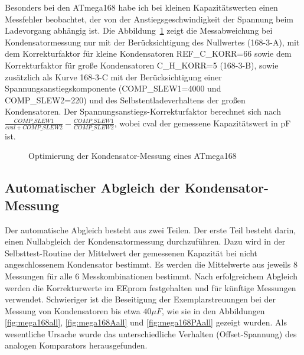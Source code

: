 Besonders bei den ATmega168 habe ich bei kleinen Kapazitätswerten einen Messfehler beobachtet, 
der von der Anstiegsgeschwindigkeit der Spannung beim Ladevorgang abhängig ist.
Die Abbildung~\ref{fig:mega168optcap} zeigt die Messabweichung bei Kondensatormessung nur mit der Berücksichtigung des
Nullwertes (168-3-A), mit dem Korrekturfaktor für kleine Kondensatoren REF\_C\_KORR=66 sowie dem Korrekturfaktor für große
Kondensatoren C\_H\_KORR=5 (168-3-B), sowie zusätzlich als Kurve 168-3-C  mit der Berücksichtigung einer Span\-nungs\-an\-stiegs\-kom\-po\-nen\-te 
(COMP\_SLEW1=4000 und COMP\_SLEW2=220) und des Selbst\-ent\-lade\-ver\-hal\-tens der großen Kon\-den\-sa\-toren.
Der Span\-nungs\-an\-stiegs-Kor\-rek\-tur\-faktor berechnet sich nach \(\frac{COMP\_SLEW1}{cval+COMP\_SLEW2} - \frac{COMP\_SLEW1}{COMP\_SLEW2}\),
wobei cval der gemessene Kapazitätswert in pF ist.

\begin{figure}[H]
\centering

\caption{Optimierung der Kondensator-Messung eines ATmega168}
\label{fig:mega168optcap}
\end{figure}

\subsection{Automatischer Abgleich der Kondensator-Messung}

Der automatische Abgleich besteht aus zwei Teilen. Der erste Teil besteht darin, einen Nullabgleich der Kondensatormessung durchzuführen.
Dazu wird in der Selbsttest-Routine der Mittelwert der gemessenen Kapazität bei nicht angeschlossenem Kondensator bestimmt.
Es werden die Mittelwerte aus jeweils 8 Messungen für alle 6 Messkombinationen bestimmt.
Nach erfolgreichem Abgleich werden die Korrekturwerte im EEprom festgehalten und für künftige Messungen verwendet.
Schwieriger ist die Beseitigung der Exemplarstreuungen bei der Messung von Kondensatoren bis etwa \(40 \mu F\), wie sie in den 
Abbildungen \ref{fig:mega168all}, \ref{fig:mega168Aall} und \ref{fig:mega168PAall} gezeigt wurden.
Als wesentliche Ursache wurde das unterschiedliche Verhalten (Offset-Spannung) des analogen Komparators herausgefunden.

